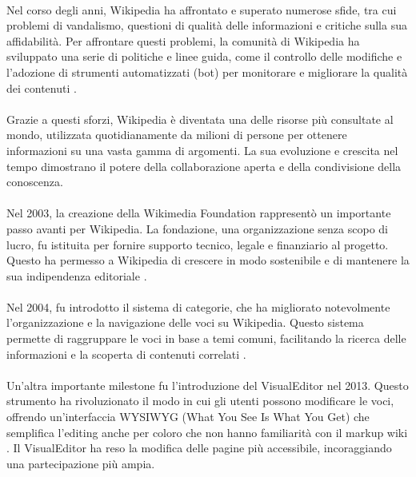 \documentclass[12pt,a4paper]{report}
\begin{document}
\paragraph*{}
Nel corso degli anni, Wikipedia ha affrontato e superato numerose sfide, tra cui problemi di vandalismo, questioni di qualità delle informazioni e critiche sulla sua affidabilità. Per affrontare questi problemi, la comunità di Wikipedia ha sviluppato una serie di politiche e linee guida, come il controllo delle modifiche e l'adozione di strumenti automatizzati (bot) per monitorare e migliorare la qualità dei contenuti \cite{jemielniak2014wikipedia}.
\paragraph*{}
Grazie a questi sforzi, Wikipedia è diventata una delle risorse più consultate al mondo, utilizzata quotidianamente da milioni di persone per ottenere informazioni su una vasta gamma di argomenti. La sua evoluzione e crescita nel tempo dimostrano il potere della collaborazione aperta e della condivisione della conoscenza.

\paragraph*{}
Nel 2003, la creazione della Wikimedia Foundation rappresentò un importante passo avanti per Wikipedia. La fondazione, una organizzazione senza scopo di lucro, fu istituita per fornire supporto tecnico, legale e finanziario al progetto. Questo ha permesso a Wikipedia di crescere in modo sostenibile e di mantenere la sua indipendenza editoriale \cite{reagle2010good}.

\paragraph*{}
Nel 2004, fu introdotto il sistema di categorie, che ha migliorato notevolmente l'organizzazione e la navigazione delle voci su Wikipedia. Questo sistema permette di raggruppare le voci in base a temi comuni, facilitando la ricerca delle informazioni e la scoperta di contenuti correlati \cite{jemielniak2014wikipedia}.

\paragraph*{}
Un'altra importante milestone fu l'introduzione del VisualEditor nel 2013. Questo strumento ha rivoluzionato il modo in cui gli utenti possono modificare le voci, offrendo un'interfaccia WYSIWYG (What You See Is What You Get) che semplifica l'editing anche per coloro che non hanno familiarità con il markup wiki \cite{history_of_wikis}. Il VisualEditor ha reso la modifica delle pagine più accessibile, incoraggiando una partecipazione più ampia.
\end{document}
